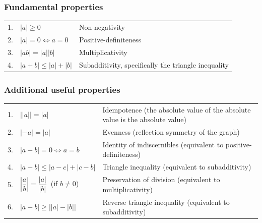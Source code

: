 \subsubsection*{Fundamental properties \cite{wiki/Absolute-value}} \label{Basic Functions/Absolute Value function or Modulus Function/Fundamental properties}

\begin{customArrayStretch}{1.2}
\begin{tabular}{r l l}
     1. & ${\displaystyle |a|\geq 0}$ & Non-negativity \\

     2. & ${\displaystyle |a|=0\iff a=0}$ & Positive-definiteness \\

     3. & ${\displaystyle |ab|=\left|a\right|\left|b\right|}$ & 	Multiplicativity \\

     4. & ${\displaystyle |a+b|\leq |a|+|b|}$ & 	Subadditivity, specifically the triangle inequality \\
\end{tabular}
\end{customArrayStretch}

\subsubsection*{Additional useful properties \cite{wiki/Absolute-value}} \label{Basic Functions/Absolute Value function or Modulus Function/Additional useful properties}

\begin{customArrayStretch}{1.5}
\begin{tabular}{r l p{13cm}}
     1. & ${\displaystyle {\bigl |}\left|a\right|{\bigr |}=|a|}$ & 	Idempotence (the absolute value of the absolute value is the absolute value) \\

     2. & ${\displaystyle \left|-a\right|=|a|}$ & Evenness (reflection symmetry of the graph) \\

     3. & ${\displaystyle |a-b|=0\iff a=b}$ & 	Identity of indiscernibles (equivalent to positive-definiteness) \\

     4. & ${\displaystyle |a-b|\leq |a-c|+|c-b|}$ & 	Triangle inequality (equivalent to subadditivity) \\

     5. & ${\displaystyle \left|{\dfrac {a}{b}}\right|={\dfrac {|a|}{|b|}}\ }$ (if ${\displaystyle b\neq 0}$) & 	Preservation of division (equivalent to multiplicativity) \\

     6. & ${\displaystyle |a-b|\geq {\bigl |}\left|a\right|-\left|b\right|{\bigr |}}$ & 	Reverse triangle inequality (equivalent to subadditivity) \\
\end{tabular}
\end{customArrayStretch}

